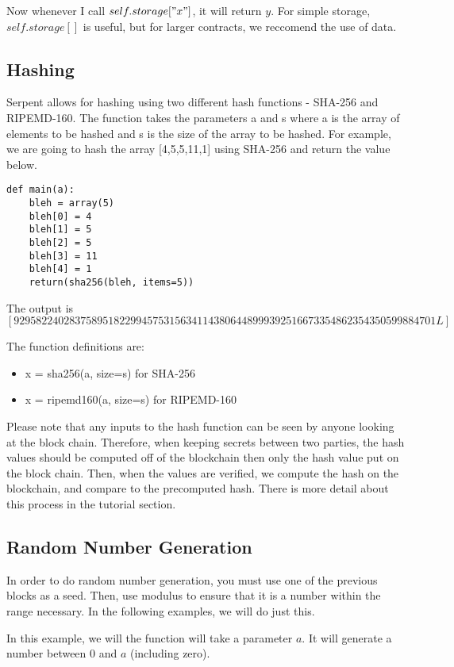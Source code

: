 \documentclass[12pt]{article}
\begin{document}
Now whenever I call $self.storage["x"]$, it will return $y$. For simple storage, $self.storage[]$ is useful, but for larger contracts, we reccomend the use of data. \cite{Serpent, Serpent 1.0 (old)}

\subsection{Hashing}
Serpent allows for hashing using two different hash functions - SHA-256 and RIPEMD-160. The function takes the parameters a and s where a is the array of elements to be hashed and s is the size of the array to be hashed. For example, we are going to hash the array [4,5,5,11,1] using SHA-256 and return the value below. \cite{Serpent}

\begin{lstlisting}
def main(a):
	bleh = array(5)
	bleh[0] = 4
	bleh[1] = 5
	bleh[2] = 5
	bleh[3] = 11
	bleh[4] = 1
	return(sha256(bleh, items=5))
\end{lstlisting}
The output is $[9295822402837589518229945753156341143806448999392516673354862354350599884701L]$

The function definitions are:
\begin{itemize}
	\item x = sha256(a, size=s) for SHA-256
	\item x = ripemd160(a, size=s) for RIPEMD-160
\end{itemize}

Please note that any inputs to the hash function can be seen by anyone looking at the block chain. Therefore, when keeping secrets between two parties, the hash values should be computed off of the blockchain then only the hash value put on the block chain. Then, when the values are verified, we compute the hash on the blockchain, and compare to the precomputed hash. There is more detail about this process in the tutorial section.

\subsection{Random Number Generation}
In order to do random number generation, you must use one of the previous blocks as a seed. Then, use modulus to ensure that it is a number within the range necessary. In the following examples, we will do just this.

In this example, we will the function will take a parameter $a$. It will generate a number between 0 and $a$ (including zero).
\end{document}

